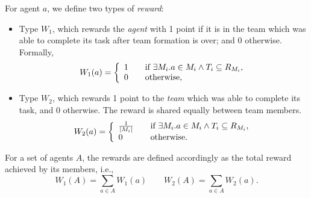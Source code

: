 \documentclass{llncs}
\begin{document}
\begin{definition}[Rewards]
For agent $a$, we define two types of \emph{reward}:
\vspace{-5pt}
\begin{itemize}
    \item Type $W_1$, which rewards the \emph{agent} with 1 point if it is in the team which was able to complete its task after team formation is over; and 0 otherwise. Formally,
\vspace{-5pt}
    \begin{equation} \label{eq:w1agent}
W_1(a) = \left\{
  \begin{array}{l l}
    1 & \quad \text{if $\exists M_i . a \in M_i \wedge T_i \subseteq R_{M_i}$,}\\
    0 & \quad \text{otherwise,}\\
  \end{array} \right.
\end{equation}
\vspace{-15pt}
    \item Type $W_2$, which rewards 1 point to the \emph{team} which was able to complete its task, and 0 otherwise. The reward is shared equally between team members.
\vspace{-5pt}
\begin{equation}
W_2(a) = \left\{
  \begin{array}{l l}
    \frac{1}{|M_i|} & \quad \text{if $\exists M_i . a \in M_i \wedge T_i \subseteq R_{M_i}$,}\\
    0 & \quad \text{otherwise.}\\
  \end{array} \right.
\label{eq:w2agent}
\end{equation}
\vspace{-5pt}
\end{itemize}
\vspace{-15pt}

For a set of agents $A$, the rewards are defined accordingly as the total reward achieved by its members, i.e.,
\vspace{-5pt}
\begin{equation} \label{eq:w1organisation}
 W_1(A) = \sum_{a \in A} W_1(a) \qquad
%
 W_2(A) = \sum_{a \in A} W_2(a).
\end{equation}
\vspace{-20pt}
\end{definition}
\end{document}
